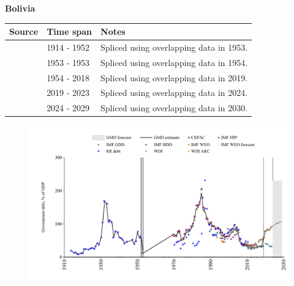 \documentclass[12pt,a4paper,landscape]{article}
\begin{document}
\begin{adjustbox}{max totalsize={\paperwidth}{\paperheight},center}
\begin{minipage}[t][\textheight][t]{\textwidth}
\vspace*{0.5cm}
{}
\begin{center}
{\Large\bfseries Bolivia}
\end{center}
\vspace{0.5cm}
\begin{table}[H]
\centering
\small
\begin{tabular}{|l|l|l|}
\hline
\textbf{Source} & \textbf{Time span} & \textbf{Notes} \\
\hline
\rowcolor{white}\cite{RR_debt}& 1914 - 1952 &Spliced using overlapping data in 1953.\\
\rowcolor{lightgray}\cite{IMF_FPP}& 1953 - 1953 &Spliced using overlapping data in 1954.\\
\rowcolor{white}\cite{IMF_GDD}& 1954 - 2018 &Spliced using overlapping data in 2019.\\
\rowcolor{lightgray}\cite{IMF_FPP}& 2019 - 2023 &Spliced using overlapping data in 2024.\\
\rowcolor{white}\cite{IMF_WEO_forecast}& 2024 - 2029 &Spliced using overlapping data in 2030.\\
\hline
\end{tabular}
\end{table}
\begin{figure}[H]
\centering
\includegraphics[width=\textwidth,height=0.6\textheight,keepaspectratio]{graphs/BOL_govdebt_GDP.pdf}
\end{figure}
\end{minipage}
\end{adjustbox}
\end{document}
